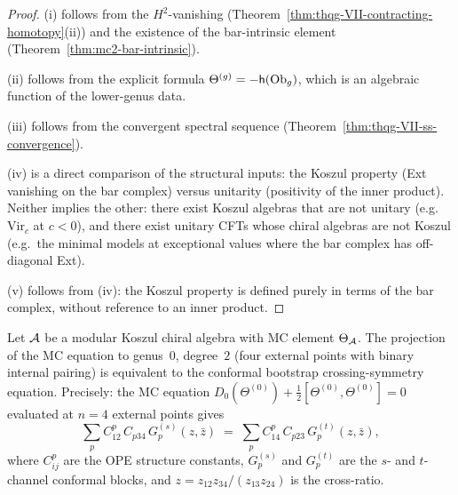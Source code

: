 \begin{proof}
(i) follows from the $H^2$-vanishing
(Theorem~\ref{thm:thqg-VII-contracting-homotopy}(ii))
and the existence of the bar-intrinsic element
(Theorem~\ref{thm:mc2-bar-intrinsic}).

(ii) follows from the explicit formula
$\Theta^{(g)} = -\mathsf{h}(\mathrm{Ob}_g)$, which is an algebraic
function of the lower-genus data.

(iii) follows from the convergent spectral sequence
(Theorem~\ref{thm:thqg-VII-ss-convergence}).

(iv) is a direct comparison of the structural inputs: the
Koszul property (Ext vanishing on the bar complex) versus
unitarity (positivity of the inner product). Neither
implies the other: there exist Koszul algebras that are not
unitary (e.g.\ $\mathrm{Vir}_c$ at $c < 0$), and there exist
unitary CFTs whose chiral algebras are not Koszul (e.g.\
the minimal models at exceptional values where the bar complex
has off-diagonal Ext).

(v) follows from (iv): the Koszul property is defined purely
in terms of the bar complex, without reference to an inner
product.
\end{proof}

\begin{theorem}
\label{thm:thqg-VII-crossing-from-mc}
\label{thm:thqg-VII-crossing-as-mc}
Let $\mathcal{A}$ be a modular Koszul chiral algebra with MC element
$\Theta_{\mathcal{A}}$. The projection of the MC equation to genus~$0$,
degree~$2$ \textup{(}four external points with binary internal
pairing\textup{)} is equivalent to the conformal bootstrap
crossing-symmetry equation. Precisely: the MC equation
$D_0(\Theta^{(0)}) + \frac{1}{2}[\Theta^{(0)},\Theta^{(0)}] = 0$
evaluated at $n = 4$ external points gives
\begin{equation}\label{eq:thqg-VII-crossing-symmetry}
\sum_p C_{12}^p\, C_{p34}\, G_p^{(s)}(z, \bar{z})
\;=\;
\sum_p C_{14}^p\, C_{p23}\, G_p^{(t)}(z, \bar{z}),
\end{equation}
where $C_{ij}^p$ are the OPE structure constants,
$G_p^{(s)}$ and $G_p^{(t)}$ are the $s$- and $t$-channel
conformal blocks, and
$z = z_{12}z_{34}/(z_{13}z_{24})$ is the cross-ratio.
\end{theorem}

